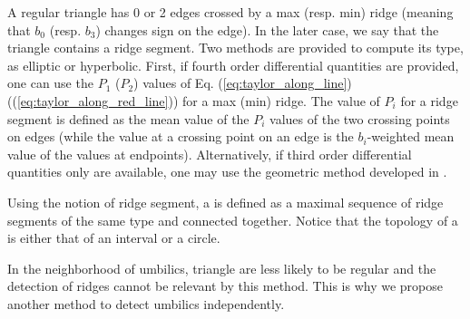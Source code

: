 A regular triangle has 0 or 2 edges crossed by a max (resp. min) ridge
(meaning that $b_0$ (resp. $b_3$) changes sign on the edge). In the later
case, we say that the triangle contains a ridge segment.
Two methods are provided to compute its type, as elliptic or
hyperbolic. First, if fourth order differential quantities are
provided, one can use the $P_1$ ($P_2$) values of Eq.
(\ref{eq:taylor_along_line}) ((\ref{eq:taylor_along_red_line})) for
a max (min) ridge. The value of $P_i$ for a ridge segment is defined
as the mean value of the $P_i$ values of the two crossing points on
edges (while the value at a crossing point on an edge is the
$b_i$-weighted mean value of the values at endpoints).
Alternatively, if third order differential quantities only are
available, one may use the geometric method developed in
\cite{cgal:cp-tdare-05}.


Using the notion of ridge segment, a  is defined as a
maximal sequence of ridge segments of the same type and connected
together.  Notice that the topology of a  is either
that of an interval or a circle.

  In the neighborhood of umbilics,
triangle are less likely to be regular and the detection of ridges
cannot be relevant by this method.  This is why we propose another
method to detect umbilics independently.

